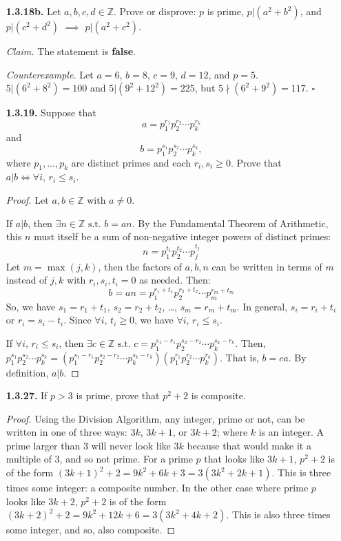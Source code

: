 \documentclass[12pt]{article}
\newcommand{\zee}{\mathbb{Z}}
\newcommand{\such}{\text{ s.t. }}
\begin{document}
\begin{itemize}
\item[\textbf{1.3.18b.}] Let $a,b,c,d\in\zee$. Prove or disprove: $p$ is prime, $p|(a^2+b^2)$, and $p|(c^2+d^2)$ $\implies$ $p|(a^2+c^2)$.

\textit{Claim.} The statement is \textbf{false}.
\par
\textit{Counterexample.}  Let $a=6$, $b=8$, $c=9$, $d=12$, and $p=5$.
$5|(6^2 + 8^2) = 100$ and $5|(9^2 + 12^2) = 225$, but $5 \nmid (6^2 + 9^2) = 117$.
$\square$


\item[\textbf{1.3.19.}] Suppose that \[a=p_1^{r_1}p_2^{r_2}\dotsb p_k^{r_k}\] and \[b=p_1^{s_1}p_2^{s_2}\dotsb p_k^{s_k},\] where $p_1,\dotsc, p_k$ are distinct primes and each $r_i,s_i\ge0$. Prove that $a|b \iff \forall i,\,r_i\le s_i$.

\begin{proof}
Let $a,b\in\zee$ with $a\neq0$.
\par
If $a|b$, then $\exists n \in \zee \such b = a n$.
By the Fundamental Theorem of Arithmetic, this $n$ must itself be a sum of non-negative integer powers of distinct primes:
\[n=p_1^{t_1}p_2^{t_2}\dotsb p_j^{t_j}\]
Let $m=\max(j,k)$, then the factors of $a, b, n$ can be written in terms of $m$ instead of $j, k$ with $r_i, s_i, t_i = 0$ as needed.
Then:
\[b = a n = p_1^{r_1 + t_1}p_2^{r_2 + t_2}\dotsb p_m^{r_m + t_m}\]
So, we have $s_1 = r_1 + t_1$, $s_2 = r_2 + t_2$, \dots, $s_m = r_m + t_m$.
In general, $s_i = r_i + t_i$ or $r_i = s_i - t_i$.
Since $\forall i$, $t_i \geq 0$, we have $\forall i$, $r_i \le s_i$.
\par
If $\forall i,\,r_i\le s_i$, then $\exists c \in \zee \such c=p_1^{s_1-r_1}p_2^{s_2-r_2}\dotsb p_k^{s_k-r_k}$.
Then, $p_1^{s_1}p_2^{s_2}\dotsb p_k^{s_k} = (p_1^{s_1-r_1}p_2^{s_2-r_2}\dotsb p_k^{s_k-r_k})(p_1^{r_1}p_2^{r_2}\dotsb p_k^{r_k})$.
That is, $b=ca$.
By definition, $a|b$.
\end{proof}


\item[\textbf{1.3.27.}] If $p>3$ is prime, prove that $p^2+2$ is composite.

\begin{proof}
Using the Division Algorithm, any integer, prime or not, can be written in one of three ways: $3k$, $3k+1$, or $3k+2$; where $k$ is an integer.
A prime larger than $3$ will never look like $3k$ because that would make it a multiple of $3$, and so not prime.
For a prime $p$ that looks like $3k+1$, $p^2+2$ is of the form ${(3k+1)}^2 + 2 = 9k^2+6k+3 = 3(3k^2+2k+1)$.
This is three times some integer: a composite number.
In the other case where prime $p$ looks like $3k+2$, $p^2+2$ is of the form ${(3k+2)}^2 + 2 = 9k^2+12k+6 = 3(3k^2+4k+2)$.
This is also three times some integer, and so, also composite.
\end{proof}



\end{itemize}
\end{document}
